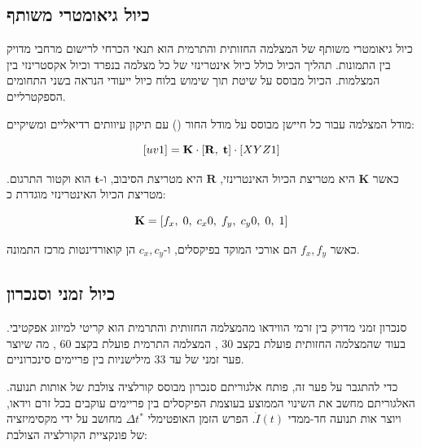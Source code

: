 \subsection{כיול גיאומטרי משותף}
\label{sec:ch03_geometric_cal}

כיול גיאומטרי משותף של המצלמה החזותית והתרמית הוא תנאי הכרחי לרישום מרחבי מדויק בין התמונות. תהליך הכיול כולל כיול אינטרינזי של כל מצלמה בנפרד וכיול אקסטרינזי בין המצלמות. הכיול מבוסס על שיטת  תוך שימוש בלוח כיול ייעודי הנראה בשני התחומים הספקטרליים.

מודל המצלמה עבור כל חיישן מבוסס על מודל החור () עם תיקון עיוותים רדיאליים ומשיקיים:

\begin{equation}
\left[u \\ v \\ 1\right] = \mathbf{K} \cdot \left[\mathbf{R},\; \mathbf{t}\right] \cdot \left[X \\ Y \\ Z \\ 1\right]
\label{eq:ch03_pinhole}
\end{equation}

כאשר $\mathbf{K}$ היא מטריצת הכיול האינטרינזי, $\mathbf{R}$ היא מטריצת הסיבוב, ו-$\mathbf{t}$ הוא וקטור התרגום. מטריצת הכיול האינטרינזי מוגדרת כ:

\begin{equation}
\mathbf{K} = \left[f_x,\; 0,\; c_x \\ 0,\; f_y,\; c_y \\ 0,\; 0,\; 1\right]
\label{eq:ch03_intrinsic}
\end{equation}

כאשר $f_x, f_y$ הם אורכי המוקד בפיקסלים, ו-$c_x, c_y$ הן קואורדינטות מרכז התמונה.

\subsection{כיול זמני וסנכרון}
\label{sec:ch03_temporal_cal}

סנכרון זמני מדויק בין זרמי הווידאו מהמצלמה החזותית והתרמית הוא קריטי למיזוג אפקטיבי. בעוד שהמצלמה החזותית פועלת בקצב 30 , המצלמה התרמית פועלת בקצב 60 , מה שיוצר פער זמני של עד 33 מילישניות בין פריימים סינכרוניים.

כדי להתגבר על פער זה, פותח אלגוריתם סנכרון מבוסס קורלציה צולבת של אותות תנועה. האלגוריתם מחשב את השינוי הממוצע בעוצמת הפיקסלים בין פריימים עוקבים בכל זרם וידאו, ויוצר אות תנועה חד-ממדי $\dot{I}(t)$. הפרש הזמן האופטימלי $\Delta t^*$ מחושב על ידי מקסימיזציה של פונקציית הקורלציה הצולבת:

